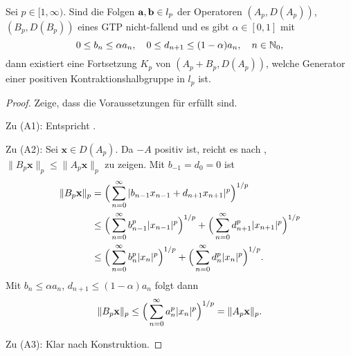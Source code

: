 \begin{fsatz}\cite{banasiak_lachowicz_2007}\label{Fortsetzung von K_p}
Sei $p\in[1,\infty)$. Sind die Folgen $\textnormal{\textbf{a}}, \textnormal{\textbf{b}}\in l_p$ der Operatoren $(A_p, D(A_p))$, $(B_p, D(B_p))$ eines GTP nicht-fallend und es gibt $\alpha\in[0,1]$ mit 
\begin{equation*}\label{Annahme für Abschätzung}
0\leq b_n\leq \alpha a_n,\quad 0\leq d_{n+1}\leq (1-\alpha)a_n, \quad n\in \mathbb{N}_0,
\end{equation*}
dann existiert eine Fortsetzung $K_p$ von $(A_p + B_p, D(A_p))$, welche Generator einer positiven Kontraktionshalbgruppe in $l_p$ ist.
\end{fsatz}

\begin{proof}
\par
Zeige, dass die Voraussetzungen für  erfüllt sind.

\par
Zu (A1): Entspricht .

\par
Zu (A2): Sei $\textbf{x}\in D(A_p)$. Da $-A$ positiv ist, reicht es nach  ,  $\|B_p\textbf{x}\|_p\leq\|A_p\textbf{x}\|_p$ zu zeigen. Mit $b_{-1}=d_0=0$ ist
\begin{align*}
\|B_p\textnormal{\textbf{x}}\|_p
&= \Big(\sum_{n=0}^\infty |b_{n-1}x_{n-1} + d_{n+1}x_{n+1}|^p\Big)^{1/p}\\
&\leq \Big(\sum_{n=0}^\infty b_{n-1}^p |x_{n-1}|^p\Big)^{1/p} + \Big(\sum_{n=0}^\infty d_{n+1}^p |x_{n+1}|^p\Big)^{1/p}\\
&\leq \Big(\sum_{n=0}^\infty b_n^p|x_n|^p\Big)^{1/p} + \Big(\sum_{n=0}^\infty d_n^p |x_n|^p\Big)^{1/p}.
\end{align*}
Mit $b_n\leq \alpha a_n$, $d_{n+1}\leq (1-\alpha)a_n$ folgt dann
\begin{equation*}
\|B_p\textnormal{\textbf{x}}\|_p\leq \Big(\sum_{n=0}^\infty a_n^p |x_n|^p\Big)^{1/p} = \|A_p \textnormal{\textbf{x}}\|_p.
\end{equation*}

\par
Zu (A3): Klar nach Konstruktion.


\end{proof}
